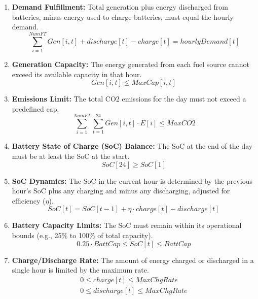 \documentclass[12pt, letterpaper]{article}
\begin{document}
\begin{enumerate}
    \item \textbf{Demand Fulfillment:} Total generation plus energy discharged from batteries, minus energy used to charge batteries, must equal the hourly demand.
    \begin{equation}
    \sum_{i=1}^{NumFT} Gen[i, t] + discharge[t] - charge[t] = hourlyDemand[t]
    \end{equation}

    \item \textbf{Generation Capacity:} The energy generated from each fuel source cannot exceed its available capacity in that hour.
    \begin{equation}
    Gen[i, t] \leq MaxCap[i, t]
    \end{equation}

    \item \textbf{Emissions Limit:} The total CO2 emissions for the day must not exceed a predefined cap.
    \begin{equation}
    \sum_{i=1}^{NumFT} \sum_{t=1}^{24} Gen[i, t] \cdot E[i] \leq MaxCO2
    \end{equation}

    \item \textbf{Battery State of Charge (SoC) Balance:} The SoC at the end of the day must be at least the SoC at the start.
    \begin{equation}
    SoC[24] \geq SoC[1]
    \end{equation}

    \item \textbf{SoC Dynamics:} The SoC in the current hour is determined by the previous hour's SoC plus any charging and minus any discharging, adjusted for efficiency ($\eta$).
    \begin{equation}
    SoC[t] = SoC[t-1] + \eta \cdot charge[t] - discharge[t]
    \end{equation}

    \item \textbf{Battery Capacity Limits:} The SoC must remain within its operational bounds (e.g., 25\% to 100\% of total capacity).
    \begin{equation}
    0.25 \cdot BattCap \leq SoC[t] \leq BattCap
    \end{equation}

    \item \textbf{Charge/Discharge Rate:} The amount of energy charged or discharged in a single hour is limited by the maximum rate.
    \begin{gather}
    0 \leq charge[t] \leq MaxChgRate \\
    0 \leq discharge[t] \leq MaxChgRate
    \end{gather}


\end{enumerate}
\end{document}
